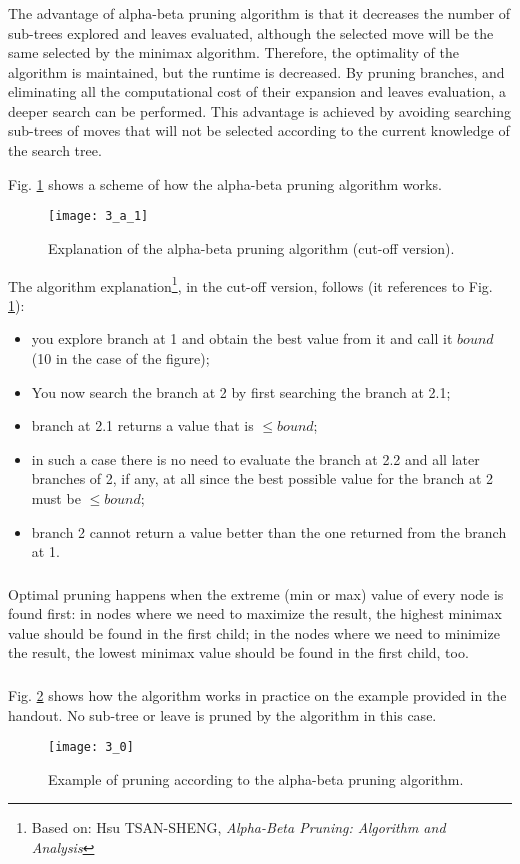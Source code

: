 \subsubsection{}
The advantage of alpha-beta pruning algorithm is that it decreases the number of sub-trees explored and leaves evaluated, although the selected move will be the same selected by the minimax algorithm. Therefore, the optimality of the algorithm is maintained, but the runtime is decreased. By pruning branches, and eliminating all the computational cost of their expansion and leaves evaluation, a deeper search can be performed. This advantage is achieved by avoiding searching sub-trees of moves that will not be selected according to the current knowledge of the search tree.

Fig. \ref{fig:3_a_1} shows a scheme of how the alpha-beta pruning algorithm works.
\begin{figure}[h]
    \centering
    \texttt{[image: 3\_a\_1]}
    \caption{Explanation of the alpha-beta pruning algorithm (cut-off version).}
    \label{fig:3_a_1}
\end{figure}
The algorithm explanation\footnote{Based on: Hsu TSAN-SHENG, \textit{Alpha-Beta Pruning: Algorithm and Analysis}}, in the cut-off version, follows (it references to Fig. \ref{fig:3_a_1}):
\begin{itemize}
    \item you explore branch at 1 and obtain the best value from it and call it $bound$ (10 in the case of the figure);
    \item You now search the branch at 2 by first searching the branch at 2.1;
    \item branch at 2.1 returns a value that is $\le bound$;
    \item in such a case there is no need to evaluate the branch at 2.2 and all later branches of 2, if any, at all since the best possible value for the branch at 2 must be $\le bound$;
    \item branch 2 cannot return a value better than the one returned from the branch at 1.
\end{itemize}

\subsubsection{}
Optimal pruning happens when the extreme (min or max) value of every node is found first: in nodes where we need to maximize the result, the highest minimax value should be found in the first child; in the nodes where we need to minimize the result, the lowest minimax value should be found in the first child, too.

\subsubsection{}
Fig. \ref{fig:3_0} shows how the algorithm works in practice on the example provided in the handout. No sub-tree or leave is pruned by the algorithm in this case.
\begin{figure}[h]
    \centering
    \texttt{[image: 3\_0]}
    \caption{Example of pruning according to the alpha-beta pruning algorithm.}
    \label{fig:3_0}
\end{figure}
